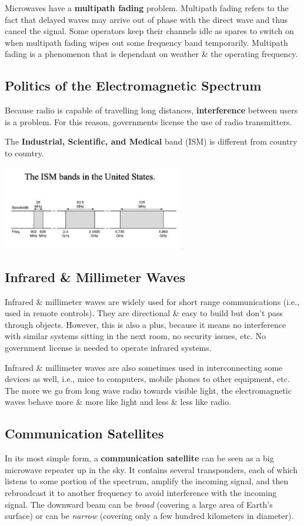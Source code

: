 \documentclass[11pt]{article}
\begin{document}
Microwaves have a \textbf{multipath fading} problem. 
Multipath fading refers to the fact that delayed waves may arrive out of phase with the direct wave and thus cancel the signal. 
Some operators keep their channels idle as spares to switch on when multipath fading wipes out some frequency band temporarily. 
Multipath fading is a phenomenon that is dependant on weather \& the operating frequency. 

\subsection{Politics of the Electromagnetic Spectrum}
Because radio is capable of travelling long distances, \textbf{interference} between users is a problem. 
For this reason, governments license the use of radio transmitters. 

The \textbf{Industrial, Scientific, and Medical} band (ISM) is different from country to country.

\begin{center}
    \includegraphics[width=0.6\textwidth]{ism.png}
\end{center}

\subsection{Infrared \& Millimeter Waves} 
Infrared \& millimeter waves are widely used for short range communications (i.e., used in remote controls). 
They are directional \& easy to build but don't pass through objects. 
However, this is also a plus, because it means no interference with similar systems sitting in the next room, no security issues, etc. 
No government license is needed to operate infrared systems. 

Infrared \& millimeter waves are also sometimes used in interconnecting some devices as well, i.e., mice to computers, mobile phones to other equipment, etc. 
The more we go from long wave radio towards visible light, the electromagnetic waves behave more \& more like light and less \& 
less like radio. 

\subsection{Communication Satellites} 
In its most simple form, a \textbf{communication satellite} can be seen as a big microwave repeater up in the sky. 
It contains several transponders, each of which listens to some portion of the spectrum, amplify the incoming signal, and then 
rebroadcast it to another frequency to avoid interference with the incoming signal. 
The downward beam can be \textit{broad} (covering a large area of Earth's surface) or can be \textit{narrow} (covering only a few hundred kilometers 
in diameter).
\end{document}
